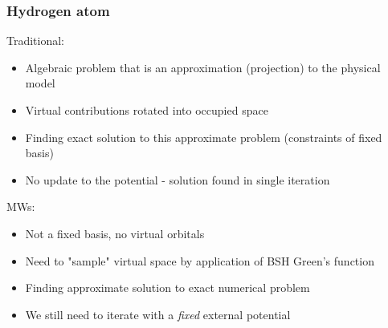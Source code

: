\begin{frame}
  \frametitle{Hydrogen atom}

  Traditional:
  \begin{itemize}
    \item Algebraic problem that is an approximation (projection) to the physical model
    \item Virtual contributions rotated into occupied space
    \item Finding exact solution to this approximate problem (constraints of fixed basis)
    \item No update to the potential - solution found in single iteration
  \end{itemize}

  MWs:
  \begin{itemize}
    \item Not a fixed basis, no virtual orbitals
    \item Need to "sample" virtual space by application of BSH Green's function
    \item Finding approximate solution to exact numerical problem
    \item We still need to iterate with a \emph{fixed} external potential
  \end{itemize}
\end{frame}

